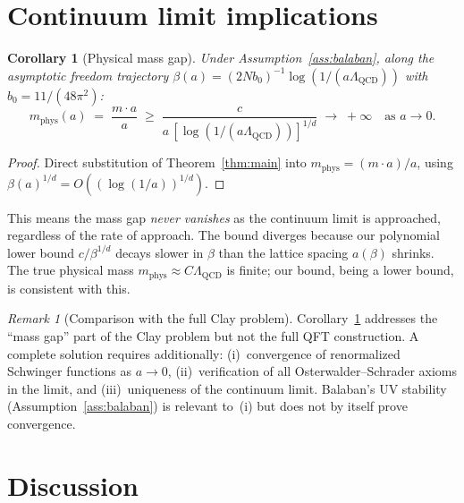 \documentclass[11pt]{article}
\newtheorem{corollary}[theorem]{Corollary}
\theoremstyle{definition}
\theoremstyle{remark}
\newtheorem{remark}[theorem]{Remark}
\begin{document}
\section{Continuum limit implications}\label{sec:continuum}

\begin{corollary}[Physical mass gap]\label{cor:continuum}
Under Assumption~\ref{ass:balaban}, along the asymptotic freedom 
trajectory $\beta(a) = (2Nb_0)^{-1}\log(1/(a\Lambda_{\mathrm{QCD}}))$ 
with $b_0 = 11/(48\pi^2)$:
\[
  m_{\mathrm{phys}}(a) \;=\; \frac{m \cdot a}{a} \;\geq\; 
  \frac{c}{a\,[\log(1/(a\Lambda_{\mathrm{QCD}}))]^{1/d}} 
  \;\longrightarrow\; +\infty
  \quad \text{as } a \to 0.
\]
\end{corollary}

\begin{proof}
Direct substitution of Theorem~\ref{thm:main} into 
$m_{\mathrm{phys}} = (m \cdot a)/a$, using 
$\beta(a)^{1/d} = O((\log(1/a))^{1/d})$.
\end{proof}

This means the mass gap \emph{never vanishes} as the continuum 
limit is approached, regardless of the rate of approach.  The 
bound diverges because our polynomial lower bound $c/\beta^{1/d}$ 
decays slower in $\beta$ than the lattice spacing $a(\beta)$ 
shrinks.  The true physical mass $m_{\mathrm{phys}} \approx 
C\Lambda_{\mathrm{QCD}}$ is finite; our bound, being a 
lower bound, is consistent with this.

\begin{remark}[Comparison with the full Clay problem]
Corollary~\ref{cor:continuum} addresses the ``mass gap'' part 
of the Clay problem but not the full QFT construction.  A complete 
solution requires additionally: (i)~convergence of renormalized 
Schwinger functions as $a \to 0$, (ii)~verification of all 
Osterwalder--Schrader axioms in the limit, and 
(iii)~uniqueness of the continuum limit.  Balaban's UV stability 
(Assumption~\ref{ass:balaban}) is relevant to~(i) but does not 
by itself prove convergence.
\end{remark}

\section{Discussion}\label{sec:discussion}
\end{document}
